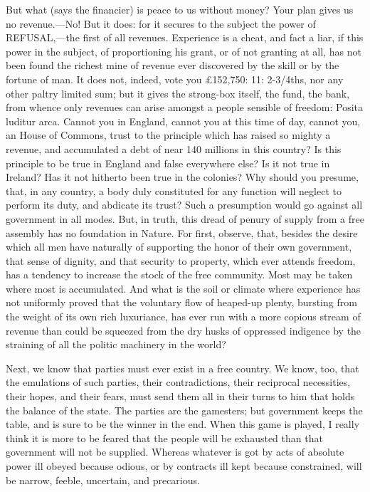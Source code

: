 But what (says the financier) is peace to us without money? Your plan gives us no revenue.—No! But it does: for it secures to the subject the power of REFUSAL,—the first of all revenues. Experience is a cheat, and fact a liar, if this power in the subject, of proportioning his grant, or of not granting at all, has not been found the richest mine of revenue ever discovered by the skill or by the fortune of man. It does not, indeed, vote you £152,750: 11: 2-3/4ths, nor any other paltry limited sum; but it gives the strong-box itself, the fund, the bank, from whence only revenues can arise amongst a people sensible of freedom: Posita luditur arca. Cannot you in England, cannot you at this time of day, cannot you, an House of Commons, trust to the principle which has raised so mighty a revenue, and accumulated a debt of near 140 millions in this country? Is this principle to be true in England and false everywhere else? Is it not true in Ireland? Has it not hitherto been true in the colonies? Why should you presume, that, in any country, a body duly constituted for any function will neglect to perform its duty, and abdicate its trust? Such a presumption would go against all government in all modes. But, in truth, this dread of penury of supply from a free assembly has no foundation in Nature. For first, observe, that, besides the desire which all men have naturally of supporting the honor of their own government, that sense of dignity, and that security to property, which ever attends freedom, has a tendency to increase the stock of the free community. Most may be taken where most is accumulated. And what is the soil or climate where experience has not uniformly proved that the voluntary flow of heaped-up plenty, bursting from the weight of its own rich luxuriance, has ever run with a more copious stream of revenue than could be squeezed from the dry husks of oppressed indigence by the straining of all the politic machinery in the world?

Next, we know that parties must ever exist in a free country. We know, too, that the emulations of such parties, their contradictions, their reciprocal necessities, their hopes, and their fears, must send them all in their turns to him that holds the balance of the state. The parties are the gamesters; but government keeps the table, and is sure to be the winner in the end. When this game is played, I really think it is more to be feared that the people will be exhausted than that government will not be supplied. Whereas whatever is got by acts of absolute power ill obeyed because odious, or by contracts ill kept because constrained, will be narrow, feeble, uncertain, and precarious.

